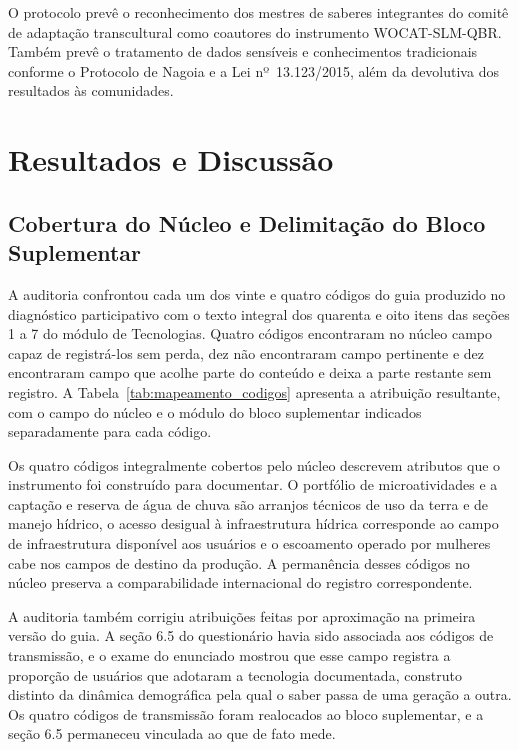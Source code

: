 \documentclass[preprint,authoryear,12pt]{elsarticle}
\begin{document}


O protocolo prevê o reconhecimento dos mestres de saberes integrantes do comitê de adaptação transcultural como coautores do instrumento WOCAT-SLM-QBR. Também prevê o tratamento de dados sensíveis e conhecimentos tradicionais conforme o Protocolo de Nagoia e a Lei nº~13.123/2015, além da devolutiva dos resultados às comunidades.

\section{Resultados e Discussão}

\subsection{Cobertura do Núcleo e Delimitação do Bloco Suplementar}

A auditoria confrontou cada um dos vinte e quatro códigos do guia produzido no diagnóstico participativo com o texto integral dos quarenta e oito itens das seções 1 a 7 do módulo de Tecnologias. Quatro códigos encontraram no núcleo campo capaz de registrá-los sem perda, dez não encontraram campo pertinente e dez encontraram campo que acolhe parte do conteúdo e deixa a parte restante sem registro. A Tabela~\ref{tab:mapeamento_codigos} apresenta a atribuição resultante, com o campo do núcleo e o módulo do bloco suplementar indicados separadamente para cada código.

Os quatro códigos integralmente cobertos pelo núcleo descrevem atributos que o instrumento foi construído para documentar. O portfólio de microatividades e a captação e reserva de água de chuva são arranjos técnicos de uso da terra e de manejo hídrico, o acesso desigual à infraestrutura hídrica corresponde ao campo de infraestrutura disponível aos usuários e o escoamento operado por mulheres cabe nos campos de destino da produção. A permanência desses códigos no núcleo preserva a comparabilidade internacional do registro correspondente.

A auditoria também corrigiu atribuições feitas por aproximação na primeira versão do guia. A seção 6.5 do questionário havia sido associada aos códigos de transmissão, e o exame do enunciado mostrou que esse campo registra a proporção de usuários que adotaram a tecnologia documentada, construto distinto da dinâmica demográfica pela qual o saber passa de uma geração a outra. Os quatro códigos de transmissão foram realocados ao bloco suplementar, e a seção 6.5 permaneceu vinculada ao que de fato mede.
\end{document}
